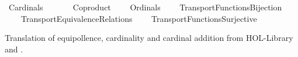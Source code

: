 %
\begin{isabellebody}%
%
%
\isadelimdocument
%
\endisadelimdocument
%
\isatagdocument
\isanewline
%
\isamarkuptrue%
%
\endisatagdocument
{\isafolddocument}%
%
\isadelimdocument
%
\endisadelimdocument
%
\isadelimtheory
%
\endisadelimtheory
%
\isatagtheory
{}\isamarkupfalse%
\ Cardinals\isanewline
\ \ \isanewline
\ \ \ \ Coproduct\isanewline
\ \ \ \ Ordinals\isanewline
\ \ \ \ Transport{\isachardot}{\kern0pt}Functions{\isacharunderscore}{\kern0pt}Bijection\isanewline
\ \ \ \ Transport{\isachardot}{\kern0pt}Equivalence{\isacharunderscore}{\kern0pt}Relations\isanewline
\ \ \ \ Transport{\isachardot}{\kern0pt}Functions{\isacharunderscore}{\kern0pt}Surjective\isanewline
{}%
\endisatagtheory
{\isafoldtheory}%
%
\isadelimtheory
%
\endisadelimtheory
%
\isadelimdocument
%
\endisadelimdocument
%
\isatagdocument
%
\isamarkuptrue%
%
\endisatagdocument
{\isafolddocument}%
%
\isadelimdocument
%
\endisadelimdocument
%
\begin{isamarkuptext}%
Translation of equipollence, cardinality and cardinal addition 
from HOL-Library and \cite{ZFC_in_HOL_AFP}.


\end{isamarkuptext}
\end{isabellebody}
